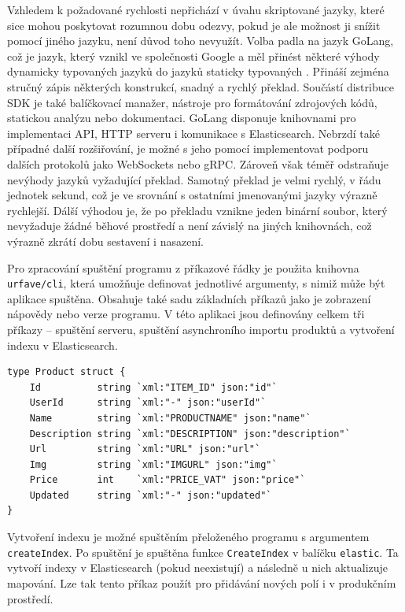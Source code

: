 \documentclass[FM,DP]{tulthesis}
\newenvironment{code}
    {\filbreak\captionsetup{type=listing}}{\filbreak}
\begin{document}
Vzhledem k požadované rychlosti nepřichází v úvahu skriptované jazyky, které sice mohou
poskytovat rozumnou dobu odezvy, pokud je ale možnost ji snížit pomocí jiného jazyku, 
není důvod toho nevyužít. Volba padla na jazyk GoLang, což je jazyk, který vznikl 
ve společnosti Google a měl přinést některé výhody dynamicky typovaných jazyků do jazyků 
staticky typovaných \cite{go-in-action}. Přináší zejména stručný zápis některých konstrukcí, 
snadný a rychlý překlad. 
Součástí distribuce SDK je také balíčkovací manažer, nástroje pro formátování zdrojových kódů, 
statickou analýzu nebo dokumentaci.
GoLang disponuje knihovnami pro implementaci API, HTTP serveru i komunikace s Elasticsearch. Nebrzdí 
také případné další rozšiřování, je možné s jeho pomocí implementovat podporu dalších protokolů jako
WebSockets nebo gRPC. Zároveň však téměř odstraňuje nevýhody jazyků vyžadující překlad.
Samotný překlad je velmi rychlý, v řádu jednotek sekund, což je ve srovnání s ostatními
jmenovanými jazyky výrazně rychlejší. Dálší výhodou je, že po překladu vznikne jeden
binární soubor, který nevyžaduje žádné běhové prostředí a není závislý na jiných knihovnách, 
což výrazně zkrátí dobu sestavení i nasazení.

Pro zpracování spuštění programu z příkazové řádky je použita knihovna \verb|urfave/cli|, 
která umožňuje definovat jednotlivé argumenty, s nimiž může být aplikace spuštěna.
Obsahuje také sadu základních příkazů jako je zobrazení nápovědy nebo verze programu.
V této aplikaci jsou definovány celkem tři příkazy -- spuštění serveru, spuštění asynchroního
importu produktů a vytvoření indexu v Elasticsearch.

\begin{code}
\captionsetup{singlelinecheck=false,justification=raggedright}
\label{code:go-product}
\begin{verbatim}
type Product struct {
    Id          string `xml:"ITEM_ID" json:"id"`
    UserId      string `xml:"-" json:"userId"`
    Name        string `xml:"PRODUCTNAME" json:"name"`
    Description string `xml:"DESCRIPTION" json:"description"`
    Url         string `xml:"URL" json:"url"`
    Img         string `xml:"IMGURL" json:"img"`
    Price       int    `xml:"PRICE_VAT" json:"price"`
    Updated     string `xml:"-" json:"updated"`
}
\end{verbatim}
\end{code}

Vytvoření indexu je možné spuštěním přeloženého programu s argumentem \verb|createIndex|.
Po spuštění je spuštěna funkce \verb|CreateIndex| v balíčku \verb|elastic|. 
Ta vytvoří indexy v Elasticsearch (pokud neexistují) a následně u nich aktualizuje mapování.
Lze tak tento příkaz použít pro přidávání nových polí i v produkčním prostředí.
\end{document}
